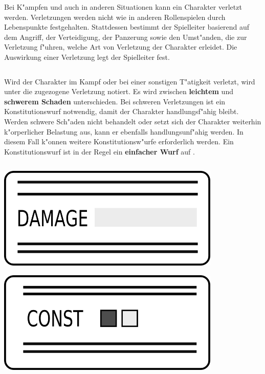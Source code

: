 Bei K"ampfen und auch in anderen Situationen kann ein Charakter verletzt werden. Verletzungen werden nicht wie in anderen Rollenspielen durch Lebenspunkte festgehalten. Stattdessen bestimmt der Spielleiter basierend auf dem Angriff, der Verteidigung, der Panzerung sowie den Umst"anden, die zur Verletzung f"uhren, welche Art von Verletzung der Charakter erleidet. Die Auswirkung einer Verletzung legt der Spielleiter fest.

\begin{column}[l]{0.58}
    Wird der Charakter im Kampf oder bei einer sonstigen T"atigkeit verletzt, wird unter  die zugezogene Verletzung notiert. Es wird zwischen \textbf{leichtem} und \textbf{schwerem Schaden} unterschieden. Bei schweren Verletzungen ist ein Konstitutionswurf notwendig, damit der Charakter handlungsf"ahig bleibt. Werden schwere Sch"aden nicht behandelt oder setzt sich der Charakter weiterhin k"orperlicher Belastung aus, kann er ebenfalls handlungsunf"ahig werden. In diesem Fall k"onnen weitere Konstitutionsw"urfe erforderlich werden. Ein Konstitutionswurf ist in der Regel ein \textbf{einfacher Wurf} auf .
\end{column}
\begin{column}[r]{0.42}
    \centering
    \includegraphics[width=0.80\textwidth]{images/character_damage.png}

    \includegraphics[width=0.80\textwidth]{images/character_const.png}
\end{column}
\smallskip

